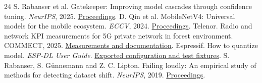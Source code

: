 \documentclass[11pt]{article}
\begin{document}
\begin{thebibliography}{24}
 S. Rabanser et al. Gatekeeper: Improving model cascades through confidence tuning. \emph{NeurIPS}, 2025. \href{https://proceedings.neurips.cc/paper_files/paper/2025/hash/1c23f6ce43a7db43dfe31f26ceabfbfe-Abstract-Conference.html}{Proceedings}.
 D. Qin et al. MobileNetV4: Universal models for the mobile ecosystem. \emph{ECCV}, 2024. \href{https://www.ecva.net/papers/eccv_2024/papers_ECCV/papers/05647.pdf}{Proceedings}.
 Telenor. Radio and network KPI measurements for 5G private network in forest environment. COMMECT, 2025. \href{https://doi.org/10.5281/zenodo.16919567}{Measurements and documentation}.
 Espressif. How to quantize model. \emph{ESP-DL User Guide}. \href{https://docs.espressif.com/projects/esp-dl/en/latest/tutorials/how_to_quantize_model.html}{Exported configuration and test fixtures}.
 S. Rabanser, S. G\"unnemann and Z. C. Lipton. Failing loudly: An empirical study of methods for detecting dataset shift. \emph{NeurIPS}, 2019. \href{https://proceedings.neurips.cc/paper/2019/hash/846c260d715e5b854ffad5f70a516c88-Abstract.html}{Proceedings}.

\end{thebibliography}

\end{document}
